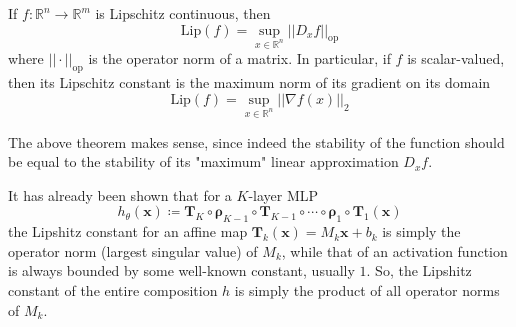   \begin{theorem}
    If $f: \mathbb{R}^n \longrightarrow \mathbb{R}^m$ is Lipschitz continuous, then 
    \begin{equation}
      \mathrm{Lip}(f) = \sup_{x \in \mathbb{R}^n} ||D_x f||_{\mathrm{op}}
    \end{equation}
    where $||\cdot ||_{\mathrm{op}}$ is the operator norm of a matrix. In particular, if $f$ is scalar-valued, then its Lipschitz constant is the maximum norm of its gradient on its domain 
    \begin{equation}
      \mathrm{Lip}(f) = \sup_{x \in \mathbb{R}^n} ||\nabla f(x)||_2
    \end{equation}
  \end{theorem}

  The above theorem makes sense, since indeed the stability of the function should be equal to the stability of its "maximum" linear approximation $D_x f$. 

  \begin{theorem}
    It has already been shown that for a $K$-layer MLP
    \begin{equation}
      h_\theta (\mathbf{x}) \coloneqq \mathbf{T}_K \circ \boldsymbol{\rho}_{K-1} \circ \mathbf{T}_{K-1} \circ \cdots \circ \boldsymbol{\rho}_1 \circ \mathbf{T}_1 (\mathbf{x})
    \end{equation}
    the Lipshitz constant for an affine map $\mathbf{T}_k (\mathbf{x}) = M_k \mathbf{x} + b_k$ is simply the operator norm (largest singular value) of $M_k$, while that of an activation function is always bounded by some well-known constant, usually $1$. So, the Lipshitz constant of the entire composition $h$ is simply the product of all operator norms of $M_k$. 
  \end{theorem}


